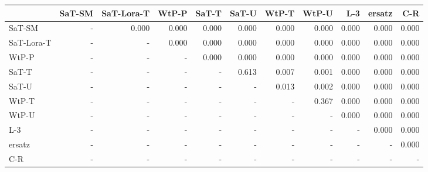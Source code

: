 \begin{tabular}{lrrrrrrrrrr}
\toprule
 & SaT-SM & SaT-Lora-T & WtP-P & SaT-T & SaT-U & WtP-T & WtP-U & L-3 & ersatz & C-R \\
\midrule
SaT-SM & - & 0.000 & 0.000 & 0.000 & 0.000 & 0.000 & 0.000 & 0.000 & 0.000 & 0.000 \\
SaT-Lora-T & - & - & 0.000 & 0.000 & 0.000 & 0.000 & 0.000 & 0.000 & 0.000 & 0.000 \\
WtP-P & - & - & - & 0.000 & 0.000 & 0.000 & 0.000 & 0.000 & 0.000 & 0.000 \\
SaT-T & - & - & - & - & 0.613 & 0.007 & 0.001 & 0.000 & 0.000 & 0.000 \\
SaT-U & - & - & - & - & - & 0.013 & 0.002 & 0.000 & 0.000 & 0.000 \\
WtP-T & - & - & - & - & - & - & 0.367 & 0.000 & 0.000 & 0.000 \\
WtP-U & - & - & - & - & - & - & - & 0.000 & 0.000 & 0.000 \\
L-3 & - & - & - & - & - & - & - & - & 0.000 & 0.000 \\
ersatz & - & - & - & - & - & - & - & - & - & 0.000 \\
C-R & - & - & - & - & - & - & - & - & - & - \\
\bottomrule
\end{tabular}

